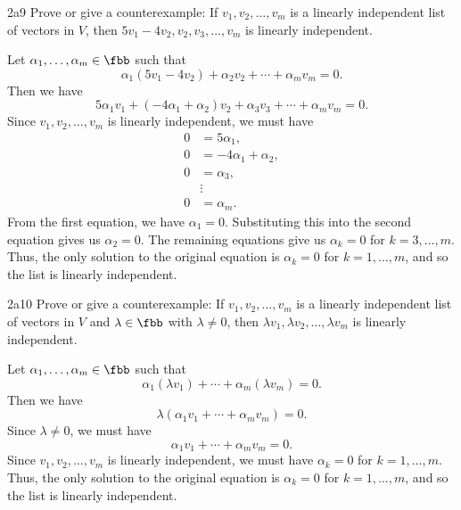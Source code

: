 \begin{exercise}{2a9}
    Prove or give a counterexample: If $v_1, v_2, \ldots, v_m$ is a linearly independent list of vectors in $V$, then
    \(5v_1 - 4v_2, v_2, v_3, \ldots, v_m\)
    is linearly independent.
\end{exercise}

\begin{sol}
    Let $\alpha_1, \ldots, \alpha_m \in \fbb$ such that
    \[
    	\alpha_1(5v_1 - 4v_2) + \alpha_2 v_2 + \cdots + \alpha_m v_m = 0.
    \]
    Then we have
    \[
    	5\alpha_1 v_1 + (-4\alpha_1 + \alpha_2)v_2 + \alpha_3 v_3 + \cdots + \alpha_m v_m = 0.
    \]
    Since $v_1, v_2, \ldots, v_m$ is linearly independent, we must have
    \begin{align*}
        0 & = 5\alpha_1, \\
        0 & = -4\alpha_1 + \alpha_2, \\
        0 & = \alpha_3, \\
        & \vdots \\
        0 & = \alpha_m.
    \end{align*}
    From the first equation, we have $\alpha_1 = 0$.
	Substituting this into the second equation gives us $\alpha_2 = 0$.
	The remaining equations give us $\alpha_k = 0$ for $k = 3, \ldots, m$.
	Thus, the only solution to the original equation is $\alpha_k = 0$ for $k = 1, \ldots, m$, and so the list is linearly independent.
\end{sol}

\begin{exercise}{2a10}
    Prove or give a counterexample: If $v_1, v_2, \ldots, v_m$ is a linearly independent list of vectors in $V$ and $\lambda \in \fbb$ with $\lambda \neq 0$, then $\lambda v_1, \lambda v_2, \ldots, \lambda v_m$ is linearly independent.
\end{exercise}

\begin{sol}
    Let $\alpha_1, \ldots, \alpha_m \in \fbb$ such that
    \[
    	\alpha_1(\lambda v_1) + \cdots + \alpha_m(\lambda v_m) = 0.
    \]
    Then we have
    \[
    	\lambda(\alpha_1 v_1 + \cdots + \alpha_m v_m) = 0.
    \]
    Since $\lambda \neq 0$, we must have
    \[
    	\alpha_1 v_1 + \cdots + \alpha_m v_m = 0.
    \]
    Since $v_1, v_2, \ldots, v_m$ is linearly independent, we must have $\alpha_k = 0$ for $k = 1, \ldots, m$.
	Thus, the only solution to the original equation is $\alpha_k = 0$ for $k = 1, \ldots, m$, and so the list is linearly independent.
\end{sol}
 
